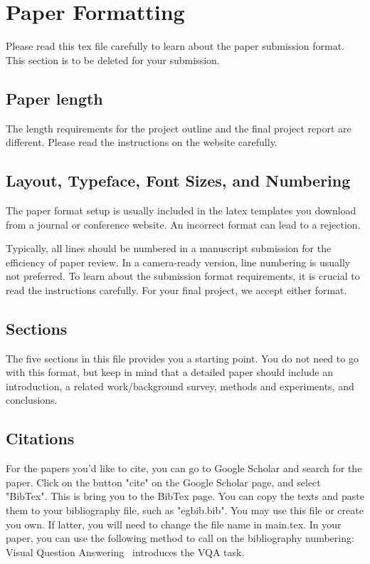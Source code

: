 \section{Paper Formatting}

Please read this tex file carefully to learn about the paper submission format. This section is to be deleted for your submission.

\subsection{Paper length}

The length requirements for the project outline and the final project report are different. Please read the instructions on the website carefully.

\subsection{Layout, Typeface, Font Sizes, and Numbering}

The paper format setup is usually included in the latex templates you download from a journal or conference website. An incorrect format can lead to a rejection.

Typically, all lines should be numbered in a manuscript submission for the efficiency of paper review. In a camera-ready version, line numbering is usually not preferred. To learn about the submission format requirements, it is crucial to read the instructions carefully. For your final project, we accept either format.

\subsection{Sections}

The five sections in this file provides you a starting point. You do not need to go with this format, but keep in mind that a detailed paper should include an introduction, a related work/background survey, methods and experiments, and conclusions.

\subsection{Citations}

For the papers you'd like to cite, you can go to Google Scholar and search for the paper. Click on the button "cite" on the Google Scholar page, and select "BibTex". This is bring you to the BibTex page. You can copy the texts and paste them to your bibliography file, such as "egbib.bib". You may use this file or create you own. If latter, you will need to change the file name in main.tex. In your paper, you can use the following method to call on the bibliography numbering: Visual Question Answering~\cite{antol2015vqa} introduces the VQA task.

